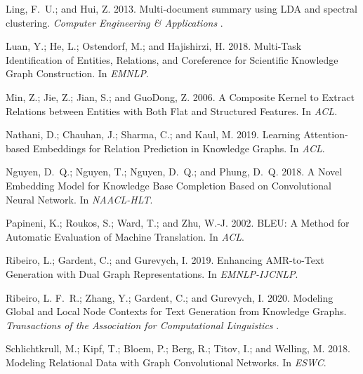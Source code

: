 \documentclass[letterpaper]{article}
\begin{document}
\begin{thebibliography}{43}
Ling, F.~U.; and Hui, Z. 2013.
\newblock Multi-document summary using LDA and spectral clustering.
\newblock \emph{Computer Engineering \& Applications} .

Luan, Y.; He, L.; Ostendorf, M.; and Hajishirzi, H. 2018.
\newblock Multi-Task Identification of Entities, Relations, and Coreference for
  Scientific Knowledge Graph Construction.
\newblock In \emph{EMNLP}.

Min, Z.; Jie, Z.; Jian, S.; and GuoDong, Z. 2006.
\newblock A Composite Kernel to Extract Relations between Entities with Both
  Flat and Structured Features.
\newblock In \emph{ACL}.

Nathani, D.; Chauhan, J.; Sharma, C.; and Kaul, M. 2019.
\newblock Learning Attention-based Embeddings for Relation Prediction in
  Knowledge Graphs.
\newblock In \emph{ACL}.

Nguyen, D.~Q.; Nguyen, T.; Nguyen, D.~Q.; and Phung, D.~Q. 2018.
\newblock A Novel Embedding Model for Knowledge Base Completion Based on
  Convolutional Neural Network.
\newblock In \emph{NAACL-HLT}.

Papineni, K.; Roukos, S.; Ward, T.; and Zhu, W.-J. 2002.
\newblock BLEU: A Method for Automatic Evaluation of Machine Translation.
\newblock In \emph{ACL}.

Ribeiro, L.; Gardent, C.; and Gurevych, I. 2019.
\newblock Enhancing AMR-to-Text Generation with Dual Graph Representations.
\newblock In \emph{EMNLP-IJCNLP}.

Ribeiro, L. F.~R.; Zhang, Y.; Gardent, C.; and Gurevych, I. 2020.
\newblock Modeling Global and Local Node Contexts for Text Generation from
  Knowledge Graphs.
\newblock \emph{Transactions of the Association for Computational Linguistics}
  .

Schlichtkrull, M.; Kipf, T.; Bloem, P.; Berg, R.; Titov, I.; and Welling, M.
  2018.
\newblock Modeling Relational Data with Graph Convolutional Networks.
\newblock In \emph{ESWC}.


\end{thebibliography}
\end{document}
